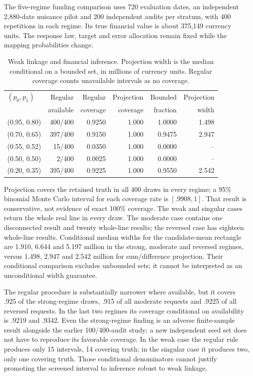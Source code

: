 The five-regime funding comparison uses 720 evaluation dates, an independent
2,880-date nuisance pilot and 200 independent audits per stratum, with 400
repetitions in each regime. Its true financial value is about 375,149 currency
units. The response law, target and error allocation remain fixed while the
mapping probabilities change.

\begin{table}[htbp]\centering\small
\caption{Weak linkage and financial inference. Projection width is the median
conditional on a bounded set, in millions of currency units. Regular coverage
counts unavailable intervals as no coverage.}
\label{s61:projection-results}
\begin{tabular}{lrrrrr}\toprule
$(p_0,p_1)$ & Regular & Regular & Projection & Bounded & Projection\\
 & available & coverage & coverage & fraction & width\\\midrule
(0.95, 0.80) & 400/400 & 0.9250 & 1.000 & 1.0000 & 1.498 \\
(0.70, 0.65) & 397/400 & 0.9150 & 1.000 & 0.9475 & 2.947 \\
(0.55, 0.52) & 15/400 & 0.0350 & 1.000 & 0.0000 & -- \\
(0.50, 0.50) & 2/400 & 0.0025 & 1.000 & 0.0000 & -- \\
(0.20, 0.35) & 395/400 & 0.9225 & 1.000 & 0.9550 & 2.542 \\
\bottomrule\end{tabular}
\end{table}

Projection covers the retained truth in all 400 draws in every regime; a
95\% binomial Monte Carlo interval for each coverage rate is $[.9908,1]$.
That result is conservative, not evidence of exact 100\% coverage. The weak
and singular cases return the whole real line in every draw. The moderate
case contains one disconnected result and twenty whole-line results; the
reversed case has eighteen whole-line results. Conditional median widths
for the candidate-mean rectangle are 1.910, 6.644 and 5.197 million in the
strong, moderate and reversed regimes, versus 1.498, 2.947 and 2.542 million
for sum/difference projection. Their conditional comparison excludes
unbounded sets; it cannot be interpreted as an unconditional width guarantee.

The regular procedure is substantially narrower where available, but it
covers .925 of the strong-regime draws, .915 of all moderate requests and
.9225 of all reversed requests. In the last two regimes its coverage
conditional on availability is .9219 and .9342. Even the strong-regime
finding is an adverse finite-sample result alongside the earlier
100/400-audit study; a new independent seed set does not have to reproduce
its favorable coverage. In the weak case the regular rule produces only
15 intervals, 14 covering truth; in the singular case it produces two,
only one covering truth. Those conditional denominators cannot justify
promoting the screened interval to inference robust to weak linkage.
